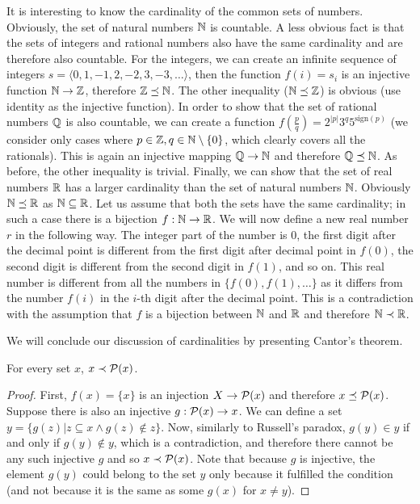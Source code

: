 It is interesting to know the cardinality of the common sets of numbers. Obviously, the set of natural numbers $\mathbb{N}$ is countable. A less obvious fact is that the sets of integers and rational numbers also have the same cardinality and are therefore also countable. For the integers, we can create an infinite sequence of integers $s = \langle 0, 1, -1, 2, -2, 3, -3, \dots \rangle$, then the function $f(i) = s_i$ is an injective function $\mathbb{N} \to \mathbb{Z}$, therefore $\mathbb{Z} \preceq \mathbb{N}$. The other inequality ($\mathbb{N} \preceq \mathbb{Z}$) is obvious (use identity as the injective function). In order to show that the set of rational numbers $\mathbb{Q}$ is also countable, we can create a function $f(\frac{p}{q}) = 2^{|p|}3^q5^{\mathrm{sign}(p)}$ (we consider only cases where $p \in \mathbb{Z}, q \in \mathbb{N} \setminus \{0\}$, which clearly covers all the rationals). This is again an injective mapping $\mathbb{Q} \to \mathbb{N}$ and therefore $\mathbb{Q} \preceq \mathbb{N}$. As before, the other inequality is trivial. Finally, we can show that the set of real numbers ${\mathbb{R}}$ has a larger cardinality than the set of natural numbers $\mathbb{N}$. Obviously $\mathbb{N} \preceq {\ensuremath{\mathbb{R}}}$ as $\mathbb{N} \subseteq {\ensuremath{\mathbb{R}}}$. Let us assume that both the sets have the same cardinality; in such a case there is a bijection $f: \mathbb{N} \to {\ensuremath{\mathbb{R}}}$. We will now define a new real number $r$ in the following way. The integer part of the number is 0, the first digit after the decimal point is different from the first digit after decimal point in $f(0)$, the second digit is different from the second digit in $f(1)$, and so on. This real number is different from all the numbers in $\{f(0), f(1), \dots\}$ as it differs from the number $f(i)$ in the $i$-th digit after the decimal point. This is a contradiction with the assumption that $f$ is a bijection between $\mathbb{N}$ and ${\mathbb{R}}$ and therefore $\mathbb{N} \prec {\ensuremath{\mathbb{R}}}$.

We will conclude our discussion of cardinalities by presenting Cantor's theorem.

\begin{theorem}[Cantor]
For every set $x$, $x \prec \mathcal{P}(x)$.
\end{theorem}

\begin{proof}
First, $f(x) = \{x\}$ is an injection $X \to \mathcal{P}(x)$ and therefore $x \preceq \mathcal{P} (x)$. Suppose there is also an injective $g: \mathcal{P} (x) \to x$. We can define a set $y = \{g(z)|z \subseteq x \land g(z) \notin z\}$. Now, similarly to Russell's paradox, $g(y) \in y$ if and only if $g(y) \notin y$, which is a contradiction, and therefore there cannot be any such injective $g$ and so $x \prec \mathcal{P}(x)$. Note that because $g$ is injective, the element $g(y)$ could belong to the set $y$ only because it fulfilled the condition (and not because it is the same as some $g(x)$ for $x \neq y$).
\end{proof}

